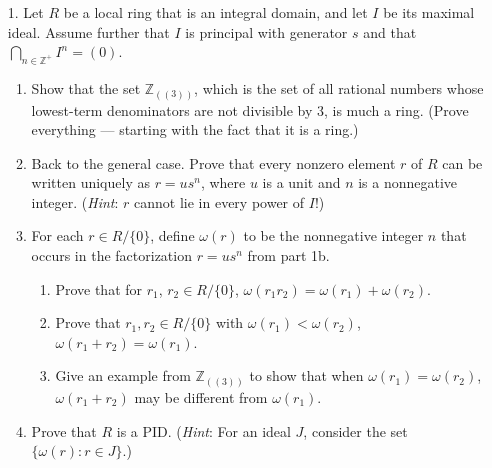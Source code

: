 \documentclass[9pt]{article}
\newcommand{\Z}{\mathbb{Z}}
\begin{document}
\begin{enumerate}
   \item[1.]   Let $R$ be a local ring that is an integral domain, and let $I$
               be its maximal ideal. Assume further that $I$ is principal with
               generator $s$ and that $\bigcap_{n\in\Z^+}I^n = (0)$.
               \begin{enumerate}
                  \item Show that the set $\Z_{((3))}$, which is the set of all
                        rational numbers whose lowest-term denominators are not
                        divisible by 3, is much a ring. (Prove everything ---
                        starting with the fact that it is a ring.)
                  \item Back to the general case. Prove that every nonzero
                        element $r$ of $R$ can be written uniquely as
                        $r = us^n$, where $u$ is a unit and $n$ is a nonnegative
                        integer. (\textit{Hint}: $r$ cannot lie in every power
                        of $I$!)
                  \item For each $r \in R/\{0\}$, define $\omega(r)$ to
                        be the nonnegative integer $n$ that occurs in the
                        factorization $r = us^n$ from part 1b.
                        \begin{enumerate}
                           \item Prove that for $r_1$, $r_2 \in R/\{0\}$,
                                 $\omega(r_1r_2) = \omega(r_1)+\omega(r_2)$.
                           \item Prove that $r_1, r_2 \in R/\{0\}$ with
                                 $\omega(r_1) < \omega(r_2)$,
                                 $\omega(r_1+r_2) = \omega(r_1)$.
                           \item Give an example from $\Z_{((3))}$ to show that
                                 when $\omega(r_1) = \omega(r_2)$,
                                 $\omega(r_1+r_2)$ may be different from
                                 $\omega(r_1)$.
                        \end{enumerate}
                  \item Prove that $R$ is a PID. (\textit{Hint}: For an ideal
                        $J$, consider the set $\{\omega(r) : r \in J\}$.)
               \end{enumerate}


\end{enumerate}
\end{document}
